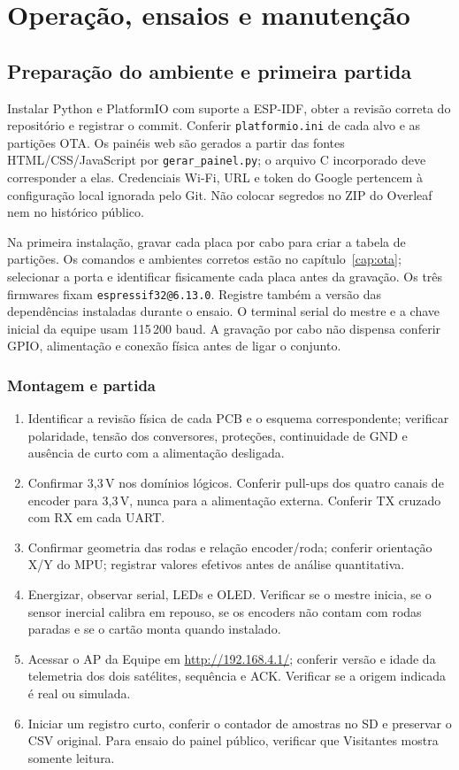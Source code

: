 \chapter{Operação, ensaios e manutenção}\label{cap:operacao}
\section{Preparação do ambiente e primeira partida}
Instalar Python e PlatformIO com suporte a ESP-IDF, obter a revisão correta do repositório e registrar o commit. Conferir \texttt{platformio.ini} de cada alvo e as partições OTA. Os painéis web são gerados a partir das fontes HTML/CSS/JavaScript por \texttt{gerar\_painel.py}; o arquivo C incorporado deve corresponder a elas. Credenciais Wi-Fi, URL e token do Google pertencem à configuração local ignorada pelo Git. Não colocar segredos no ZIP do Overleaf nem no histórico público.

Na primeira instalação, gravar cada placa por cabo para criar a tabela de partições. Os comandos e ambientes corretos estão no capítulo~\ref{cap:ota}; selecionar a porta e identificar fisicamente cada placa antes da gravação.
Os três firmwares fixam \texttt{espressif32@6.13.0}. Registre também a versão das dependências instaladas durante o ensaio. O terminal serial do mestre e a chave inicial da equipe usam 115\,200 baud. A gravação por cabo não dispensa conferir GPIO, alimentação e conexão física antes de ligar o conjunto.

\subsection{Montagem e partida}
\begin{enumerate}
\item Identificar a revisão física de cada PCB e o esquema correspondente; verificar polaridade, tensão dos conversores, proteções, continuidade de GND e ausência de curto com a alimentação desligada.
\item Confirmar 3,3\,V nos domínios lógicos. Conferir pull-ups dos quatro canais de encoder para 3,3\,V, nunca para a alimentação externa. Conferir TX cruzado com RX em cada UART.
\item Confirmar geometria das rodas e relação encoder/roda; conferir orientação X/Y do MPU; registrar valores efetivos antes de análise quantitativa.
\item Energizar, observar serial, LEDs e OLED. Verificar se o mestre inicia, se o sensor inercial calibra em repouso, se os encoders não contam com rodas paradas e se o cartão monta quando instalado.
\item Acessar o AP da Equipe em \url{http://192.168.4.1/}; conferir versão e idade da telemetria dos dois satélites, sequência e ACK. Verificar se a origem indicada é real ou simulada.
\item Iniciar um registro curto, conferir o contador de amostras no SD e preservar o CSV original. Para ensaio do painel público, verificar que Visitantes mostra somente leitura.
\end{enumerate}

